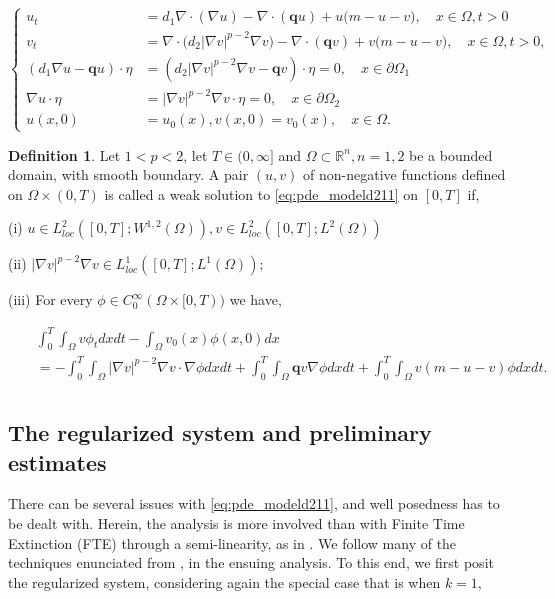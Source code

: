 \documentclass[10pt]{amsart}
\theoremstyle{plain}
\theoremstyle{definition}
\newtheorem{definition}[theorem]{Definition}
\begin{document}
\begin{equation}
\label{eq:pde_modeld211}
\left\{ \begin{array}{ll}
u_t &= d_1 \nabla \cdot (\nabla u) - \nabla\cdot (\textbf{q}  u)+  u\Big(m-u-v\Big), \quad x\in \Omega, t>0\\
		v_t &= \nabla \cdot \Big( d_2 |\nabla v|^{p-2}  \nabla v \Big)  - \nabla\cdot (\textbf{q}  v) + v\Big(m-u-v\Big), \quad x\in\Omega,t>0, \\
(d_{1}\nabla u - \textbf{q} u)  \cdot \eta &= (d_2   |\nabla v|^{p-2}  \nabla v - \textbf{q} v)  \cdot \eta =0, \quad x\in \partial \Omega_{1} \\
 \nabla u \cdot \eta &= |\nabla v|^{p-2} \nabla v \cdot \eta=0, \quad x\in \partial \Omega_{2} \\
		u(x,0)&=u_0(x), v(x,0)=v_{0} (x), \quad x\in \Omega .
\end{array}\right.
\end{equation}




\begin{definition}
\label{def:d11}
Let $1<p<2$, let $T \in (0,\infty]$ and $\Omega \subset \mathbb{R}^{n}, n=1,2$ be a bounded domain, with smooth boundary. A pair $(u,v)$ of non-negative functions defined on $\Omega \times (0,T)$ is called a weak solution to \eqref{eq:pde_modeld211} on $[0,T]$ if,

(i) $u \in L^{2}_{loc}([0,T];W^{1,2}(\Omega)), v \in L^{2}_{loc}([0,T];L^{2}(\Omega))$

(ii) $|\nabla v|^{p-2} \nabla v \in L^{1}_{loc}([0,T];L^{1}(\Omega));$

(iii) For every $\phi \in C^{\infty}_{0}(\Omega \times [0,T))$ we have,

\begin{eqnarray}
&& \int^{T}_{0}\int_{\Omega} v \phi_{t} dxdt - \int_{\Omega} v_{0}(x) \phi(x,0)dx \nonumber \\
&& = 
- \int^{T}_{0}\int_{\Omega} |\nabla v|^{p-2} \nabla v \cdot \nabla \phi dx dt + \int^{T}_{0}\int_{\Omega}\textbf{q} v \nabla \phi dx dt + \int^{T}_{0}\int_{\Omega} v(m-u-v) \phi dxdt . \nonumber \\
\end{eqnarray}
\end{definition}

\subsection{The regularized system and preliminary estimates}
There can be several issues with \eqref{eq:pde_modeld211}, and well posedness has to be dealt with. Herein, the analysis is more involved than with Finite Time Extinction (FTE) through a semi-linearity, as in \cite{parshad2021some}. We follow many of the techniques enunciated from \cite{li2020global, rani2024global, cong2016degenerate, dibenedetto2012degenerate}, in the ensuing analysis. To this end, we first posit the regularized system, considering again the special case that is when $k=1$,
\end{document}
